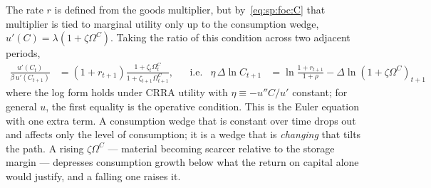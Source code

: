  The rate $r$ is defined from the goods multiplier, but by~\eqref{eq:sp:foc:C} that multiplier is tied to marginal utility only up to the consumption wedge, $u'\left(C\right)=\lambda\left(1+\zeta\Omega^C\right)$. Taking the ratio of this condition across two adjacent periods,
\begin{align}
\frac{u'\left(C_t\right)}{\beta\,u'\left(C_{t+1}\right)} &= \left(1+r_{t+1}\right)\frac{1+\zeta_t\Omega^C_t}{1+\zeta_{t+1}\Omega^C_{t+1}},
&&\text{i.e.}
&
\eta\,\Delta\ln C_{t+1} &= \ln\frac{1+r_{t+1}}{1+\rho}-\Delta\ln\left(1+\zeta\Omega^C\right)_{t+1}
\label{eq:sp:keynes-ramsey}
\end{align}
where the log form holds under CRRA utility with $\eta\equiv-u''C/u'$ constant; for general $u$, the first equality is the operative condition. This is the Euler equation with one extra term. A consumption wedge that is constant over time drops out and affects only the level of consumption; it is a wedge that is \emph{changing} that tilts the path. A rising $\zeta\Omega^C$ --- material becoming scarcer relative to the storage margin --- depresses consumption growth below what the return on capital alone would justify, and a falling one raises it.
